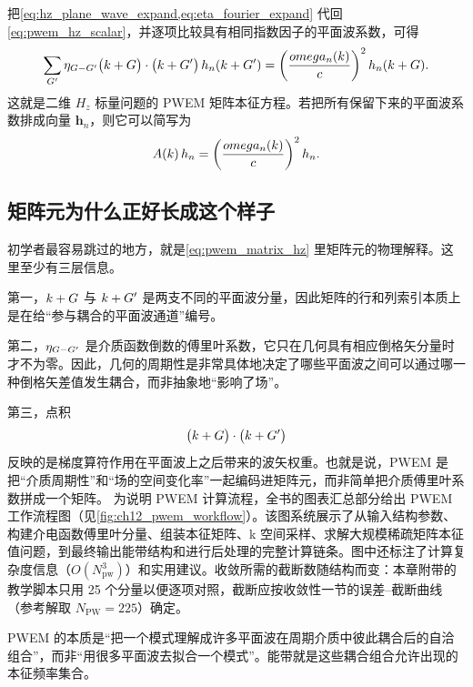 把\cref{eq:hz_plane_wave_expand,eq:eta_fourier_expand} 代回 \cref{eq:pwem_hz_scalar}，并逐项比较具有相同指数因子的平面波系数，可得
\begin{equation}
\sum_{G'}
\eta_{G-G'}
\bigl(k+G\bigr)\cdot\bigl(k+G'\bigr)
\,h_n(k+G')
=
\left(\frac{omega_n(k)}{c}\right)^2
h_n(k+G).
\label{eq:pwem_matrix_hz}
\end{equation}
这就是二维 $H_z$ 标量问题的 PWEM 矩阵本征方程。若把所有保留下来的平面波系数排成向量 $\bm h_n$，则它可以简写为
\begin{equation}
A(k)\,h_n
=
\left(\frac{omega_n(k)}{c}\right)^2h_n.
\label{eq:pwem_matrix_compact}
\end{equation}

\subsection{矩阵元为什么正好长成这个样子}
初学者最容易跳过的地方，就是\cref{eq:pwem_matrix_hz} 里矩阵元的物理解释。这里至少有三层信息。

第一，$k+G$ 与 $k+G'$ 是两支不同的平面波分量，因此矩阵的行和列索引本质上是在给“参与耦合的平面波通道”编号。

第二，$\eta_{G-G'}$ 是介质函数倒数的傅里叶系数，它只在几何具有相应倒格矢分量时才不为零。因此，几何的周期性是非常具体地决定了哪些平面波之间可以通过哪一种倒格矢差值发生耦合，而非抽象地“影响了场”。

第三，点积
\begin{equation}
\bigl(k+G\bigr)\cdot\bigl(k+G'\bigr)
\end{equation}
反映的是梯度算符作用在平面波上之后带来的波矢权重。也就是说，PWEM 是把“介质周期性”和“场的空间变化率”一起编码进矩阵元，而非简单把介质傅里叶系数拼成一个矩阵。
为说明 PWEM 计算流程，全书的图表汇总部分给出 PWEM 工作流程图（见\cref{fig:ch12_pwem_workflow}）。该图系统展示了从输入结构参数、构建介电函数傅里叶分量、组装本征矩阵、k 空间采样、求解大规模稀疏矩阵本征值问题，到最终输出能带结构和进行后处理的完整计算链条。图中还标注了计算复杂度信息（$O(N_{\mathrm{pw}}^3)$）和实用建议。收敛所需的截断数随结构而变：本章附带的教学脚本只用 25 个分量以便逐项对照，截断应按收敛性一节的误差--截断曲线（参考解取 $N_{\mathrm{PW}}=225$）确定。


PWEM 的本质是“把一个模式理解成许多平面波在周期介质中彼此耦合后的自洽组合”，而非“用很多平面波去拟合一个模式”。能带就是这些耦合组合允许出现的本征频率集合。


